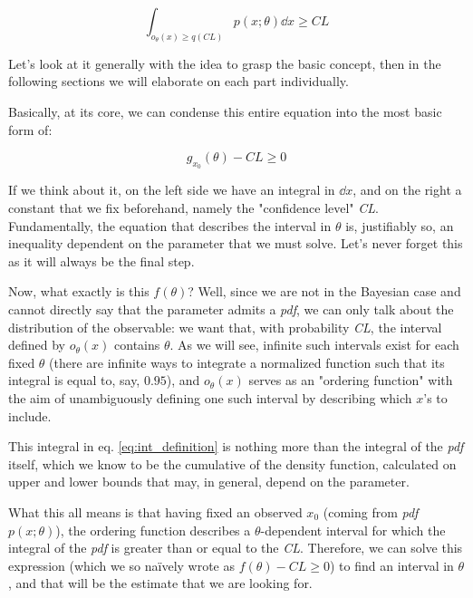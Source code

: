 \begin{equation}
	\int_{o_{\theta}(x)\geq q(CL)} p(x;\theta)\dd x \geq CL
	\label{eq:int_definition}
\end{equation}

Let's look at it generally with the idea to grasp the basic concept, then in the following sections we will elaborate on each part individually.

Basically, at its core, we can condense this entire equation into the most basic form of:

	\[
	g_{x_0}(\theta) - CL \geq 0
	\]

If we think about it, on the left side we have an integral in $\dd x$, and on the right a constant that we fix beforehand, namely the "confidence level" \emph{CL}. Fundamentally, the equation that describes the interval in $\theta$ is, justifiably so, an inequality dependent on the parameter that we must solve. Let's never forget this as it will always be the final step. 

Now, what exactly is this $f(\theta)$? Well, since we are not in the Bayesian case and cannot directly say that the parameter admits a \emph{pdf}, we can only talk about the distribution of the observable: we want that, with probability \emph{CL}, the interval defined by $o_{\theta}(x)$ contains $\theta$. As we will see, infinite such intervals exist for each fixed $\theta$ (there are infinite ways to integrate a normalized function such that its integral is equal to, say, $0.95$), and $o_{\theta}(x)$ serves as an "ordering function" with the aim of unambiguously defining one such interval by describing which $x$'s to include. 

This integral in eq. \ref{eq:int_definition} is nothing more than the integral of the \emph{pdf} itself, which we know to be the cumulative of the density function, calculated on upper and lower bounds that may, in general, depend on the parameter. 

What this all means is that having fixed an observed $x_0$ (coming from \emph{pdf} $p(x;\theta)$), the ordering function describes a $\theta$-dependent interval for which the integral of the \emph{pdf} is greater than or equal to the \emph{CL}. Therefore, we can solve this expression (which we so naïvely wrote as $f(\theta) - CL \geq 0$) to find an interval in $\theta$, and that will be the estimate that we are looking for. 

